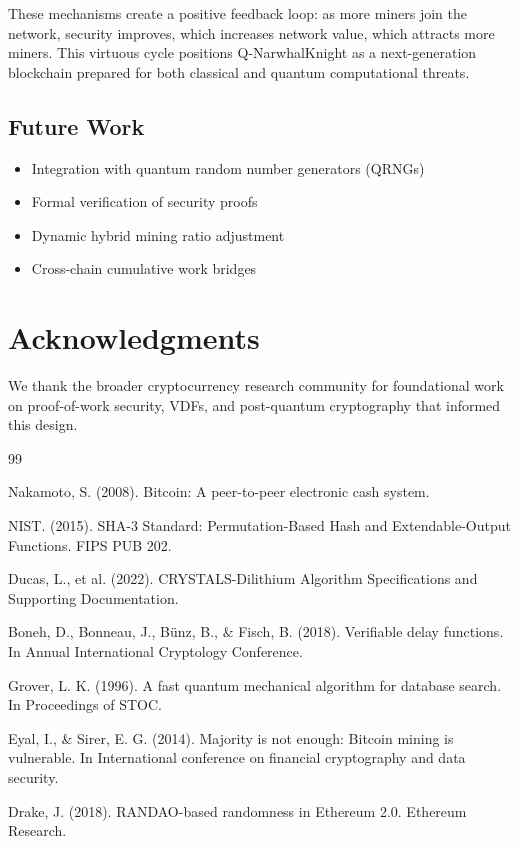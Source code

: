 \documentclass[11pt,a4paper]{article}
\begin{document}
These mechanisms create a positive feedback loop: as more miners join the network, security improves, which increases network value, which attracts more miners. This virtuous cycle positions Q-NarwhalKnight as a next-generation blockchain prepared for both classical and quantum computational threats.

\subsection{Future Work}

\begin{itemize}
    \item Integration with quantum random number generators (QRNGs)
    \item Formal verification of security proofs
    \item Dynamic hybrid mining ratio adjustment
    \item Cross-chain cumulative work bridges
\end{itemize}

\section*{Acknowledgments}

We thank the broader cryptocurrency research community for foundational work on proof-of-work security, VDFs, and post-quantum cryptography that informed this design.

\begin{thebibliography}{99}

Nakamoto, S. (2008). Bitcoin: A peer-to-peer electronic cash system.

NIST. (2015). SHA-3 Standard: Permutation-Based Hash and Extendable-Output Functions. FIPS PUB 202.

Ducas, L., et al. (2022). CRYSTALS-Dilithium Algorithm Specifications and Supporting Documentation.

Boneh, D., Bonneau, J., B\"{u}nz, B., \& Fisch, B. (2018). Verifiable delay functions. In Annual International Cryptology Conference.

Grover, L. K. (1996). A fast quantum mechanical algorithm for database search. In Proceedings of STOC.

Eyal, I., \& Sirer, E. G. (2014). Majority is not enough: Bitcoin mining is vulnerable. In International conference on financial cryptography and data security.

Drake, J. (2018). RANDAO-based randomness in Ethereum 2.0. Ethereum Research.

\end{thebibliography}
\end{document}
